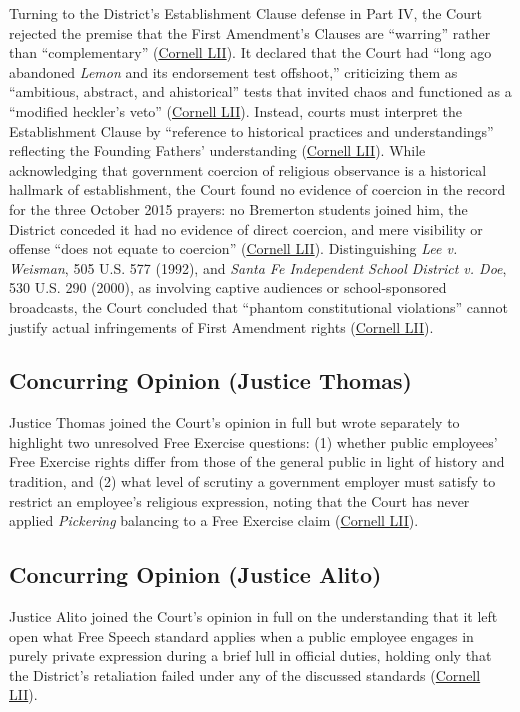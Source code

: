 \documentclass[12pt]{article}
\begin{document}
Turning to the District's Establishment Clause defense in Part IV, the Court rejected the premise that the First Amendment's Clauses are ``warring'' rather than ``complementary'' (\href{https://www.law.cornell.edu/supremecourt/text/21-418}{Cornell LII}). It declared that the Court had ``long ago abandoned \textit{Lemon} and its endorsement test offshoot,'' criticizing them as ``ambitious, abstract, and ahistorical'' tests that invited chaos and functioned as a ``modified heckler's veto'' (\href{https://www.law.cornell.edu/supremecourt/text/21-418}{Cornell LII}). Instead, courts must interpret the Establishment Clause by ``reference to historical practices and understandings'' reflecting the Founding Fathers' understanding (\href{https://www.law.cornell.edu/supremecourt/text/21-418}{Cornell LII}). While acknowledging that government coercion of religious observance is a historical hallmark of establishment, the Court found no evidence of coercion in the record for the three October 2015 prayers: no Bremerton students joined him, the District conceded it had no evidence of direct coercion, and mere visibility or offense ``does not equate to coercion'' (\href{https://www.law.cornell.edu/supremecourt/text/21-418}{Cornell LII}). Distinguishing \textit{Lee v. Weisman}, 505 U.S. 577 (1992), and \textit{Santa Fe Independent School District v. Doe}, 530 U.S. 290 (2000), as involving captive audiences or school-sponsored broadcasts, the Court concluded that ``phantom constitutional violations'' cannot justify actual infringements of First Amendment rights (\href{https://www.law.cornell.edu/supremecourt/text/21-418}{Cornell LII}).

\subsection{Concurring Opinion (Justice Thomas)}
Justice Thomas joined the Court's opinion in full but wrote separately to highlight two unresolved Free Exercise questions: (1) whether public employees' Free Exercise rights differ from those of the general public in light of history and tradition, and (2) what level of scrutiny a government employer must satisfy to restrict an employee's religious expression, noting that the Court has never applied \textit{Pickering} balancing to a Free Exercise claim (\href{https://www.law.cornell.edu/supremecourt/text/21-418}{Cornell LII}).

\subsection{Concurring Opinion (Justice Alito)}
Justice Alito joined the Court's opinion in full on the understanding that it left open what Free Speech standard applies when a public employee engages in purely private expression during a brief lull in official duties, holding only that the District's retaliation failed under any of the discussed standards (\href{https://www.law.cornell.edu/supremecourt/text/21-418}{Cornell LII}).
\end{document}
